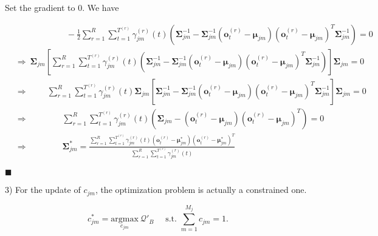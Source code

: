 \documentclass{article}
\renewcommand{\qedsymbol}{\hfill $\blacksquare$\par}
\begin{document}
    Set the gradient to 0. We have
    
    \vspace{-2.5em}
    \begin{align*}
        &\qquad\qquad\qquad -\frac{1}{2}\sum_{r=1}^R\sum_{t=1}^{T^{(r)}}\gamma_{jm}^{(r)}(t)\left(\boldsymbol{\Sigma}_{jm}^{-1}
        -\boldsymbol{\Sigma}_{jm}^{-1}\left(\mathbf{o}^{(r)}_t-\boldsymbol{\mu}_{jm}\right)\left(\mathbf{o}^{(r)}_t-\boldsymbol{\mu}_{jm}\right)^T\boldsymbol{\Sigma}_{jm}^{-1}\right) = 0 \\
        &\Longrightarrow\  \boldsymbol{\Sigma}_{jm}\left[\sum_{r=1}^R\sum_{t=1}^{T^{(r)}}\gamma_{jm}^{(r)}(t)\left(\boldsymbol{\Sigma}_{jm}^{-1}
        -\boldsymbol{\Sigma}_{jm}^{-1}\left(\mathbf{o}^{(r)}_t-\boldsymbol{\mu}_{jm}\right)\left(\mathbf{o}^{(r)}_t-\boldsymbol{\mu}_{jm}\right)^T\boldsymbol{\Sigma}_{jm}^{-1}\right)\right]\boldsymbol{\Sigma}_{jm} = 0 \\
        &\Longrightarrow\qquad\  \sum_{r=1}^R\sum_{t=1}^{T^{(r)}}\gamma_{jm}^{(r)}(t)\boldsymbol{\Sigma}_{jm}\left[\boldsymbol{\Sigma}_{jm}^{-1}
        -\boldsymbol{\Sigma}_{jm}^{-1}\left(\mathbf{o}^{(r)}_t-\boldsymbol{\mu}_{jm}\right)\left(\mathbf{o}^{(r)}_t-\boldsymbol{\mu}_{jm}\right)^T\boldsymbol{\Sigma}_{jm}^{-1}\right]\boldsymbol{\Sigma}_{jm} = 0 \\
        &\Longrightarrow\qquad\qquad \sum_{r=1}^R\sum_{t=1}^{T^{(r)}}\gamma_{jm}^{(r)}(t)\left(\boldsymbol{\Sigma}_{jm}        -\left(\mathbf{o}^{(r)}_t-\boldsymbol{\mu}_{jm}\right)\left(\mathbf{o}^{(r)}_t-\boldsymbol{\mu}_{jm}\right)^T\right) = 0 \\
        &\Longrightarrow \qquad\qquad\boldsymbol{\Sigma}_{jm}^*=\frac{\sum_{r=1}^R\sum_{t=1}^{T^{(r)}}\gamma_{jm}^{(r)}(t)\left(\mathbf{o}^{(r)}_t-\boldsymbol{\mu}^*_{jm}\right)\left(\mathbf{o}^{(r)}_t-\boldsymbol{\mu}^*_{jm}\right)^T}{\sum_{r=1}^R\sum_{t=1}^{T^{(r)}}\gamma_{jm}^{(r)}(t)}
    \end{align*}
    
\vspace{-3.6em} \qedsymbol

\vspace{5em}
\hspace{-2.3em}
3)\quad
    For the update of $c_{jm}$, the optimization problem is actually a constrained one.
    
    \vspace{-1em}
    $$c_{jm}^* = \underset{c_{jm}}{\mathrm{argmax}}\ \mathcal{Q}'_B\quad\text{ s.t. }\sum_{m=1}^{M_j}c_{jm}=1.$$
    
\end{document}
